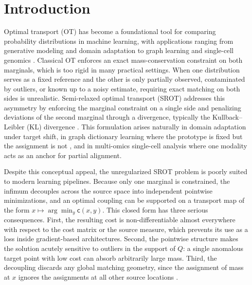 \documentclass{article}
\begin{document}
\section{Introduction}
Optimal transport (OT) has become a foundational tool for comparing probability distributions in machine learning, with applications ranging from generative modeling and domain adaptation to graph learning and single-cell genomics \cite{computationaloptitranbsoort, domainadaptation}. Classical OT enforces an exact mass-conservation constraint on both marginals, which is too rigid in many practical settings. When one distribution serves as a fixed reference and the other is only partially observed, contaminated by outliers, or known up to a noisy estimate, requiring exact matching on both sides is unrealistic. Semi-relaxed optimal transport (SROT) addresses this asymmetry by enforcing the marginal constraint on a single side and penalizing deviations of the second marginal through a divergence, typically the Kullback--Leibler (KL) divergence \cite{chizat2018scaling}. This formulation arises naturally in domain adaptation under target shift, in graph dictionary learning where the prototype is fixed but the assignment is not \cite{vincentcuaz2022semirelaxed}, and in multi-omics single-cell analysis where one modality acts as an anchor for partial alignment.

Despite this conceptual appeal, the unregularized SROT problem is poorly suited to modern learning pipelines. Because only one marginal is constrained, the infimum decouples across the source space into independent pointwise minimizations, and an optimal coupling can be supported on a transport map of the form $x \mapsto \arg\min_{y} \mathsf{c}(x, y)$. This closed form has three serious consequences. First, the resulting cost is non-differentiable almost everywhere with respect to the cost matrix or the source measure, which prevents its use as a loss inside gradient-based architectures. Second, the pointwise structure makes the solution acutely sensitive to outliers in the support of $Q$: a single anomalous target point with low cost can absorb arbitrarily large mass. Third, the decoupling discards any global matching geometry, since the assignment of mass at $x$ ignores the assignments at all other source locations \cite{le2021robust, nguyen2023unbalanced}.
\end{document}
